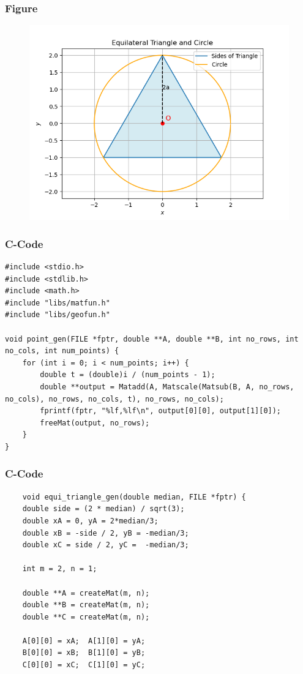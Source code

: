 \documentclass{beamer}
\begin{document}
 
\begin{frame}
\frametitle{Figure}
\begin{figure}
    \centering
    \includegraphics[width=0.7\linewidth]{Figure_1.png}
     
\end{figure}
\end{frame}
\begin{frame}[fragile]
\frametitle{C-Code}
\begin{verbatim}
#include <stdio.h>
#include <stdlib.h>
#include <math.h>
#include "libs/matfun.h"
#include "libs/geofun.h"

void point_gen(FILE *fptr, double **A, double **B, int no_rows, int no_cols, int num_points) {
    for (int i = 0; i < num_points; i++) {
        double t = (double)i / (num_points - 1);
        double **output = Matadd(A, Matscale(Matsub(B, A, no_rows, no_cols), no_rows, no_cols, t), no_rows, no_cols);
        fprintf(fptr, "%lf,%lf\n", output[0][0], output[1][0]);
        freeMat(output, no_rows);
    }
}
\end{verbatim}
\end{frame}
\begin{frame}[fragile]
\frametitle{C-Code}
\begin{verbatim}
    void equi_triangle_gen(double median, FILE *fptr) {
    double side = (2 * median) / sqrt(3);
    double xA = 0, yA = 2*median/3;
    double xB = -side / 2, yB = -median/3;
    double xC = side / 2, yC =  -median/3;
    
    int m = 2, n = 1;
    
    double **A = createMat(m, n);
    double **B = createMat(m, n);
    double **C = createMat(m, n);
    
    A[0][0] = xA;  A[1][0] = yA;
    B[0][0] = xB;  B[1][0] = yB;
    C[0][0] = xC;  C[1][0] = yC;

\end{verbatim}
\end{frame}
\end{document}
